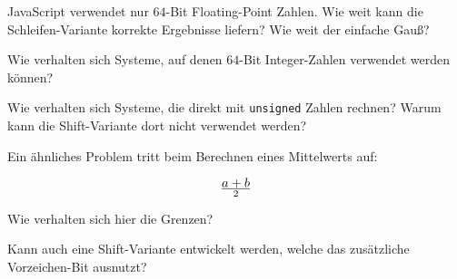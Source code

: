 \documentclass[a5paper,landscape,ngerman,10pt]{article}
\begin{document}
JavaScript verwendet nur $64$-Bit Floating-Point Zahlen.
Wie weit kann die Schleifen-Variante korrekte Ergebnisse
liefern? Wie weit der einfache Gauß?

Wie verhalten sich Systeme, auf denen $64$-Bit Integer-Zahlen
verwendet werden können?

Wie verhalten sich Systeme, die direkt mit
\lstinline!unsigned! Zahlen rechnen?
Warum kann die Shift-Variante dort nicht verwendet werden?

Ein ähnliches Problem tritt beim Berechnen eines Mittelwerts
auf:

\[a+b\over2\]

Wie verhalten sich hier die Grenzen?

Kann auch eine Shift-Variante entwickelt werden, welche
das zusätzliche Vorzeichen-Bit ausnutzt?
\end{document}
